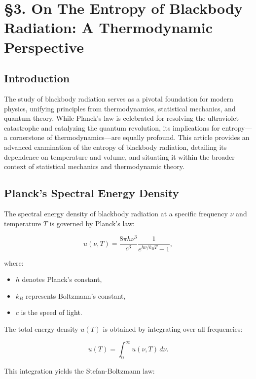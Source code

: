 

 \section*{§3. On The Entropy of Blackbody Radiation: A Thermodynamic Perspective}

 \subsection*{Introduction}
 The study of blackbody radiation serves as a pivotal foundation for modern physics, unifying principles from thermodynamics, statistical mechanics, and quantum theory. While Planck’s law is celebrated for resolving the ultraviolet catastrophe and catalyzing the quantum revolution, its implications for entropy—a cornerstone of thermodynamics—are equally profound. This article provides an advanced examination of the entropy of blackbody radiation, detailing its dependence on temperature and volume, and situating it within the broader context of statistical mechanics and thermodynamic theory.

 \subsection*{Planck's Spectral Energy Density}
 The spectral energy density of blackbody radiation at a specific frequency $\nu$ and temperature $T$ is governed by Planck’s law:

 \begin{equation}
  u(\nu, T) = \frac{8 \pi h \nu^3}{c^3} \frac{1}{e^{h \nu / k_B T} - 1},
 \end{equation}

 where:

 \begin{itemize}
  \item $h$ denotes Planck’s constant,
  \item $k_B$ represents Boltzmann’s constant,
  \item $c$ is the speed of light.
 \end{itemize}

 The total energy density $u(T)$ is obtained by integrating over all frequencies:

 \begin{equation}
  u(T) = \int_0^\infty u(\nu, T) \, d\nu.
 \end{equation}

 This integration yields the Stefan-Boltzmann law:

